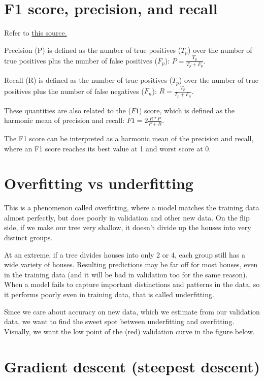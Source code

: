 \documentclass[12pt]{report}
\begin{document}
\section{F1 score, precision, and recall}
Refer to \href{https://scikit-learn.org/stable/auto_examples/model_selection/plot_precision_recall.html#precision-recall}{this source.}

Precision (P) is defined as the number of true positives ($T_p$) over the number of true positives plus the number of false positives ($F_p$):
$P = \frac{T_p}{T_p + F_p} $.

Recall    (R) is defined as the number of true positives ($T_p$) over the number of true positives plus the number of false negatives ($F_n$):
$R = \frac{T_p}{T_p + F_n} $.

These quantities are also related to the ($F1$) score, which is defined as the harmonic mean of precision and recall:
$F1 = 2 \frac{R * P}{ P + R } $.

The F1 score can be interpreted as a harmonic mean of the precision and recall, where an F1 score reaches its best value at 1 and worst score at 0.

\section{Overfitting vs underfitting}
This is a phenomenon called overfitting, where a model matches the training data almost perfectly, but does poorly in validation and other new data. On the flip side, if we make our tree very shallow, it doesn't divide up the houses into very distinct groups.

At an extreme, if a tree divides houses into only 2 or 4, each group still has a wide variety of houses. Resulting predictions may be far off for most houses, even in the training data (and it will be bad in validation too for the same reason). When a model fails to capture important distinctions and patterns in the data, so it performs poorly even in training data, that is called underfitting.

Since we care about accuracy on new data, which we estimate from our validation data, we want to find the sweet spot between underfitting and overfitting. Visually, we want the low point of the (red) validation curve in the figure below.

\section{Gradient descent (steepest descent)}
\end{document}
